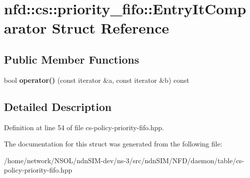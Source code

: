 \hypertarget{structnfd_1_1cs_1_1priority__fifo_1_1EntryItComparator}{}\section{nfd\+:\+:cs\+:\+:priority\+\_\+fifo\+:\+:Entry\+It\+Comparator Struct Reference}
\label{structnfd_1_1cs_1_1priority__fifo_1_1EntryItComparator}
\subsection*{Public Member Functions}
\begin{DoxyCompactItemize}
\item 
bool {\bfseries operator()} (const iterator \&a, const iterator \&b) const\hypertarget{structnfd_1_1cs_1_1priority__fifo_1_1EntryItComparator_a2a962cb0af115928d59b301a82b5d229}{}\label{structnfd_1_1cs_1_1priority__fifo_1_1EntryItComparator_a2a962cb0af115928d59b301a82b5d229}

\end{DoxyCompactItemize}


\subsection{Detailed Description}


Definition at line 54 of file cs-\/policy-\/priority-\/fifo.\+hpp.



The documentation for this struct was generated from the following file\+:\begin{DoxyCompactItemize}
\item 
/home/network/\+N\+S\+O\+L/ndn\+S\+I\+M-\/dev/ns-\/3/src/ndn\+S\+I\+M/\+N\+F\+D/daemon/table/cs-\/policy-\/priority-\/fifo.\+hpp\end{DoxyCompactItemize}
